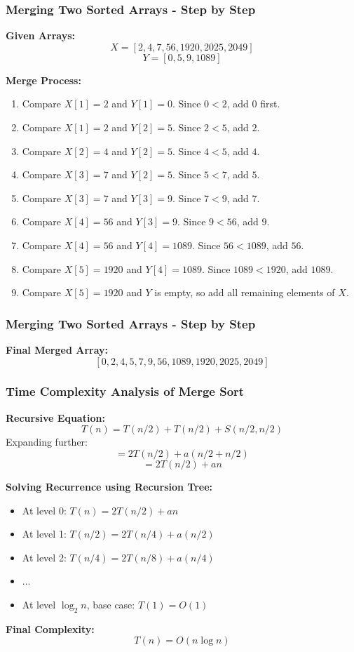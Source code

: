 \begin{frame}
    \frametitle{Merging Two Sorted Arrays - Step by Step}

    \textbf{Given Arrays:}  
    \[
    X = [2,4,7,56,1920,2025,2049]
    \]
    \[
    Y = [0,5,9,1089]
    \]

    \textbf{Merge Process:}
    \begin{enumerate}
        \item Compare \( X[1] = 2 \) and \( Y[1] = 0 \). Since \( 0 < 2 \), add \( 0 \) first.
        \item Compare \( X[1] = 2 \) and \( Y[2] = 5 \). Since \( 2 < 5 \), add \( 2 \).
        \item Compare \( X[2] = 4 \) and \( Y[2] = 5 \). Since \( 4 < 5 \), add \( 4 \).
        \item Compare \( X[3] = 7 \) and \( Y[2] = 5 \). Since \( 5 < 7 \), add \( 5 \).
        \item Compare \( X[3] = 7 \) and \( Y[3] = 9 \). Since \( 7 < 9 \), add \( 7 \).
        \item Compare \( X[4] = 56 \) and \( Y[3] = 9 \). Since \( 9 < 56 \), add \( 9 \).
        \item Compare \( X[4] = 56 \) and \( Y[4] = 1089 \). Since \( 56 < 1089 \), add \( 56 \).
        \item Compare \( X[5] = 1920 \) and \( Y[4] = 1089 \). Since \( 1089 < 1920 \), add \( 1089 \).
        \item Compare \( X[5] = 1920 \) and \( Y \) is empty, so add all remaining elements of \( X \).
    \end{enumerate}

   

\end{frame}


\begin{frame}
      \frametitle{Merging Two Sorted Arrays - Step by Step}
     \textbf{Final Merged Array:}  
    \[
    [0,2,4,5,7,9,56,1089,1920,2025,2049]
    \]
\end{frame}

\begin{frame}
    \frametitle{Time Complexity Analysis of Merge Sort}

    \textbf{Recursive Equation:}  
    \[
    T(n) = T(n/2) + T(n/2) + S(n/2, n/2)
    \]
    Expanding further:
    \[
    = 2T(n/2) + a(n/2 + n/2)
    \]
    \[
    = 2T(n/2) + an
    \]

    \textbf{Solving Recurrence using Recursion Tree:}
    \begin{itemize}
        \item At level 0: \( T(n) = 2T(n/2) + an \)
        \item At level 1: \( T(n/2) = 2T(n/4) + a(n/2) \)
        \item At level 2: \( T(n/4) = 2T(n/8) + a(n/4) \)
        \item ...
        \item At level \( \log_2 n \), base case: \( T(1) = O(1) \)
    \end{itemize}
    
    \textbf{Final Complexity:}  
    \[
    T(n) = O(n \log n)
    \]

\end{frame}

